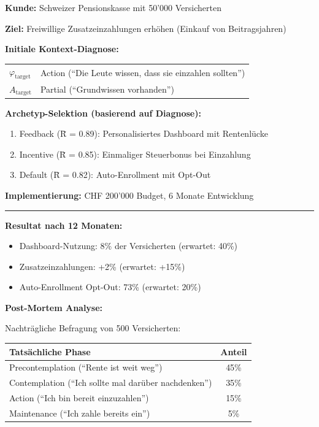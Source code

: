 \begin{tcolorbox}[colback=red!3!white, colframe=red!60!black,
    title=\textbf{Case Study 1: Die Pensionskasse und die ``Action''-Illusion}]

\textbf{Kunde:} Schweizer Pensionskasse mit 50'000 Versicherten

\textbf{Ziel:} Freiwillige Zusatzeinzahlungen erhöhen (Einkauf von Beitragsjahren)

\textbf{Initiale Kontext-Diagnose:}
\begin{center}
\begin{tabular}{@{}ll@{}}
$\varphi_{\text{target}}$ & Action (``Die Leute wissen, dass sie einzahlen sollten'') \\
$A_{\text{target}}$ & Partial (``Grundwissen vorhanden'') \\
\end{tabular}
\end{center}

\textbf{Archetyp-Selektion (basierend auf Diagnose):}
\begin{enumerate}[nosep]
    \item Feedback (R̄ = 0.89): Personalisiertes Dashboard mit Rentenlücke
    \item Incentive (R̄ = 0.85): Einmaliger Steuerbonus bei Einzahlung
    \item Default (R̄ = 0.82): Auto-Enrollment mit Opt-Out
\end{enumerate}

\textbf{Implementierung:} CHF 200'000 Budget, 6 Monate Entwicklung

\medskip
\hrule
\medskip

\textbf{Resultat nach 12 Monaten:}
\begin{itemize}[nosep]
    \item Dashboard-Nutzung: 8\% der Versicherten (erwartet: 40\%)
    \item Zusatzeinzahlungen: +2\% (erwartet: +15\%)
    \item Auto-Enrollment Opt-Out: 73\% (erwartet: 20\%)
\end{itemize}

\textbf{Post-Mortem Analyse:}

Nachträgliche Befragung von 500 Versicherten:
\begin{center}
\begin{tabular}{@{}lc@{}}
\toprule
\textbf{Tatsächliche Phase} & \textbf{Anteil} \\
\midrule
Precontemplation (``Rente ist weit weg'') & 45\% \\
Contemplation (``Ich sollte mal darüber nachdenken'') & 35\% \\
Action (``Ich bin bereit einzuzahlen'') & 15\% \\
Maintenance (``Ich zahle bereits ein'') & 5\% \\
\bottomrule
\end{tabular}
\end{center}


\end{tcolorbox}
